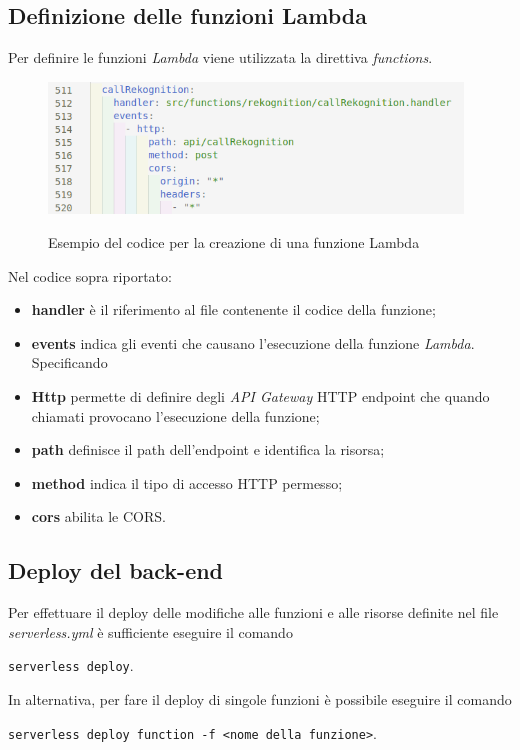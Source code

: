 	\subsection{Definizione delle funzioni Lambda}
	Per definire le funzioni \emph{Lambda} viene utilizzata la direttiva \emph{functions}. 
	
	\begin{figure}[H]
		\centering
		\includegraphics[width=11cm]{immagini/lambda.png} \\
		\caption{\label{fig:lambda} Esempio del codice per la creazione di una funzione Lambda}
	\end{figure}

	Nel codice sopra riportato:
	\begin{itemize}
		\item \textbf{handler} è il riferimento al file contenente il codice della funzione; 
		\item \textbf{events} indica gli eventi che causano l'esecuzione della funzione \emph{Lambda}. Specificando \item \textbf{Http} permette di definire degli \emph{API Gateway} HTTP endpoint che quando chiamati provocano l'esecuzione della funzione;
		\item \textbf{path} definisce il path dell'endpoint e identifica la risorsa;
		\item \textbf{method} indica il tipo di accesso HTTP permesso;
		\item \textbf{cors} abilita le \gls{CORS}.
	\end{itemize}
	
	\subsection{Deploy del back-end}
	Per effettuare il \gls{deploy} delle modifiche alle funzioni e alle risorse definite nel file \emph{serverless.yml} è sufficiente eseguire il comando
	\begin{center}
		\texttt{serverless deploy}.
	\end{center} 
	In alternativa, per fare il \gls{deploy} di singole funzioni è possibile eseguire il comando 
	\begin{center}
		\texttt{serverless deploy function -f <nome della funzione>}.
	\end{center}

